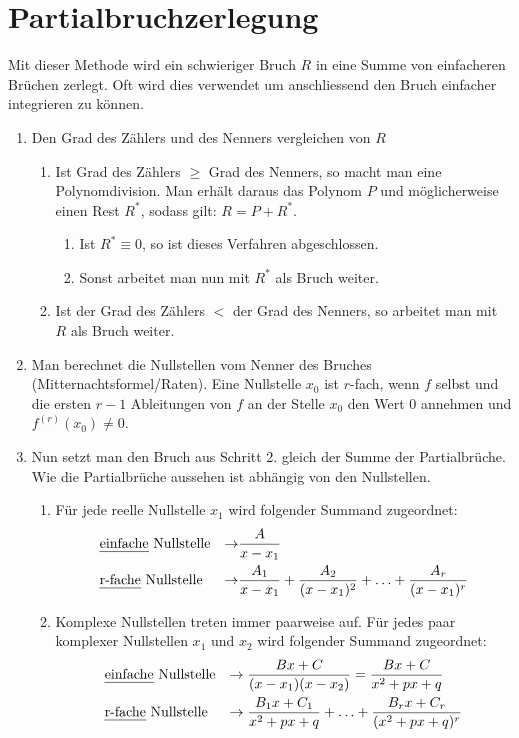 \section{Partialbruchzerlegung}
Mit dieser Methode wird ein schwieriger Bruch $R$ in eine Summe von einfacheren
Brüchen zerlegt. Oft wird dies verwendet um anschliessend den Bruch einfacher integrieren zu können.

\begin{enumerate}[leftmargin=*]
	\item Den Grad des Zählers und des Nenners vergleichen von $R$
	\begin{enumerate}[leftmargin=0.3cm]
		\item Ist Grad des Zählers $\geq$ Grad des Nenners, so macht man eine 
		Polynomdivision. Man erhält daraus das Polynom $P$ und möglicherweise einen 
		Rest $R^*$, sodass gilt: $R = P + R^*$.
		\begin{enumerate}
			\item Ist $R^* \equiv 0$, so ist dieses Verfahren abgeschlossen.
			\item Sonst arbeitet man nun mit $R^*$ als Bruch weiter.
		\end{enumerate}
		\item Ist der Grad des Zählers $<$ der Grad des Nenners, so arbeitet man mit $R$ als Bruch weiter.
	\end{enumerate}
	\item Man berechnet die Nullstellen vom Nenner des Bruches (Mitternachtsformel/Raten). 
	Eine Nullstelle $x_0$ ist $r$-fach, wenn $f$ selbst und die ersten $r-1$ Ableitungen von $f$ an der Stelle $x_0$ den Wert $0$ annehmen und $f^{(r)}(x_0) \neq 0$.
	\item Nun setzt man den Bruch aus Schritt 2. gleich der Summe der
	Partialbrüche. Wie die Partialbrüche aussehen ist abhängig von den Nullstellen.  
	\begin{enumerate}[leftmargin=0.3cm]
		\item Für jede reelle Nullstelle $x_1$ wird folgender Summand zugeordnet:
		\begin{align*}
			&\text{\emph{einfache} Nullstelle} &\to& \frac{A}{x - x_1}\\
			&\text{\emph{r-fache} Nullstelle} &\to& \frac{A_1}{x - x_1} + 
				\frac{A_2}{(x - x_1)^2} + \ldots + \frac{A_r}{(x - x_1)^r}
		\end{align*}

		\item Komplexe Nullstellen treten immer paarweise auf. Für jedes paar komplexer Nullstellen $x_1$ und $x_2$ wird folgender Summand zugeordnet:
		\begin{align*}
			&\text{\emph{einfache} Nullstelle} &\to& \; \frac{Bx + C}{(x - x_1)(x - x_2)} = \frac{Bx + C}{x^2 +px + q}\\
			&\text{\emph{r-fache} Nullstelle} &\to& \; \frac{B_1 x + C_1}{x^2 +px + q} + 
				\ldots + \frac{B_r x + C_r}{(x^2 +px + q)^r}
		\end{align*}		


\end{enumerate}
\end{enumerate}
